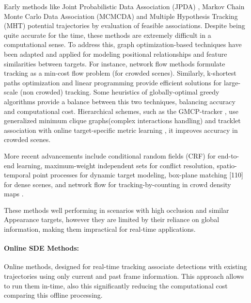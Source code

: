\documentclass[12pt, a4paper]{article}
\begin{document}
Early methods like Joint Probabilistic Data Association (JPDA) \cite{JPDA}, Markov Chain Monte Carlo Data Association (MCMCDA) \cite{MCMCDA} and Multiple Hypothesis Tracking (MHT) \cite{MHT} potential trajectories by evaluation of feasible associations. Despite being quite accurate for the time, these methods are extremely difficult in a computational sense. To address this, graph optimization-based techniques \cite{global-data-association-using-network-flows, min-cost-network-flows, k-shortest-paths-for-mot, linear-programming-in-MOT} have been adapted and applied for modeling positional relationships and feature similarities between targets. For instance, network flow methods \cite{global-data-association-using-network-flows, min-cost-network-flows} formulate tracking as a min-cost flow problem (for crowded scenes). Similarly, k-shortest paths optimization \cite{k-shortest-paths-for-mot} and linear programming \cite{linear-programming-in-MOT} provide efficient solutions for large-scale (non crowded) tracking. Some heuristics of globally-optimal greedy algorithms \cite{global-optimal-greedy}
provide a balance between this two techniques, balancing accuracy and computational cost. Hierarchical schemes, such as the GMCP-tracker \cite{GMCP-tracker}, use generalized minimum clique graphs(complex interactions handling) and tracklet association with online target-specific metric learning \cite{target-specific-metric-learning}, it improves accuracy in crowded scenes. 

More recent advancements include conditional random fields (CRF) \cite{conditional-random-fields} for end-to-end learning, maximum-weight independent sets \cite{max-weight-set} for conflict resolution, spatio-temporal point processes \cite{Spatio-Temporal-Point-Process} for dynamic target modeling, box-plane matching [110] for dense scenes, and network flow for tracking-by-counting in crowd density maps \cite{Tracking-by-Counting}.

These methods well performing in scenarios with high occlusion and similar Appearance targets, however they are limited by their reliance on global information, making them impractical for real-time applications.

\paragraph{Online SDE Methods:}
Online methods, designed for real-time tracking associate detections with existing trajectories using only current and past frame information. This approach allows to run them in-time, also this significantly reducing the computational cost comparing this offline processing.
\end{document}
